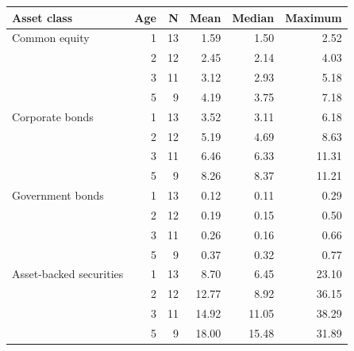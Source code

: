 \begin{tabular}{lrrrrr}
\toprule
Asset class & Age & N & Mean & Median & Maximum \\
\midrule
Common equity & 1 & 13 & 1.59 & 1.50 & 2.52 \\
 & 2 & 12 & 2.45 & 2.14 & 4.03 \\
 & 3 & 11 & 3.12 & 2.93 & 5.18 \\
 & 5 & 9 & 4.19 & 3.75 & 7.18 \\
Corporate bonds & 1 & 13 & 3.52 & 3.11 & 6.18 \\
 & 2 & 12 & 5.19 & 4.69 & 8.63 \\
 & 3 & 11 & 6.46 & 6.33 & 11.31 \\
 & 5 & 9 & 8.26 & 8.37 & 11.21 \\
Government bonds & 1 & 13 & 0.12 & 0.11 & 0.29 \\
 & 2 & 12 & 0.19 & 0.15 & 0.50 \\
 & 3 & 11 & 0.26 & 0.16 & 0.66 \\
 & 5 & 9 & 0.37 & 0.32 & 0.77 \\
Asset-backed securities & 1 & 13 & 8.70 & 6.45 & 23.10 \\
 & 2 & 12 & 12.77 & 8.92 & 36.15 \\
 & 3 & 11 & 14.92 & 11.05 & 38.29 \\
 & 5 & 9 & 18.00 & 15.48 & 31.89 \\
\bottomrule
\end{tabular}
